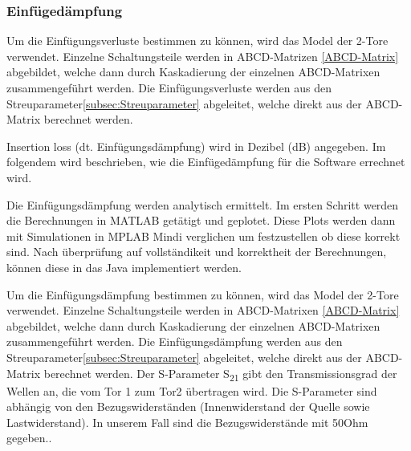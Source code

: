 \subsubsection{Einfügedämpfung}\label{subsec:einfuge}


 Um die Einfügungsverluste bestimmen zu können, wird das Model der 2-Tore verwendet. Einzelne Schaltungsteile werden in ABCD-Matrizen \ref{ABCD-Matrix} abgebildet, welche dann durch Kaskadierung der einzelnen ABCD-Matrixen zusammengeführt werden. Die Einfügungsverluste werden aus den Streuparameter\ref{subsec:Streuparameter} abgeleitet, welche direkt aus der ABCD-Matrix berechnet werden.




Insertion loss (dt. Einfügungsdämpfung) wird in Dezibel (dB) angegeben. Im folgendem wird beschrieben, wie die Einfügedämpfung für die Software errechnet wird.

Die Einfügungsdämpfung werden analytisch ermittelt. Im ersten Schritt werden die Berechnungen in MATLAB getätigt und geplotet. Diese Plots werden dann mit Simulationen in MPLAB Mindi verglichen um festzustellen ob diese korrekt sind. Nach überprüfung auf vollständikeit und korrektheit der Berechnungen, können diese in das Java implementiert werden.

Um die Einfügungsdämpfung bestimmen zu können, wird das Model der 2-Tore verwendet. Einzelne Schaltungsteile werden in ABCD-Matrixen \ref{ABCD-Matrix} abgebildet, welche dann durch Kaskadierung der einzelnen ABCD-Matrixen zusammengeführt werden. Die Einfügungsdämpfung werden aus den Streuparameter\ref{subsec:Streuparameter} abgeleitet, welche direkt aus der ABCD-Matrix berechnet werden.
Der S-Parameter S\textsubscript{21} gibt den Transmissionsgrad der Wellen an, die vom Tor 1 zum Tor2 übertragen wird. Die S-Parameter sind abhängig von den Bezugswiderständen (Innenwiderstand der Quelle sowie Lastwiderstand). In unserem Fall sind die Bezugswiderstände mit 50Ohm gegeben.\cite{hftech}.